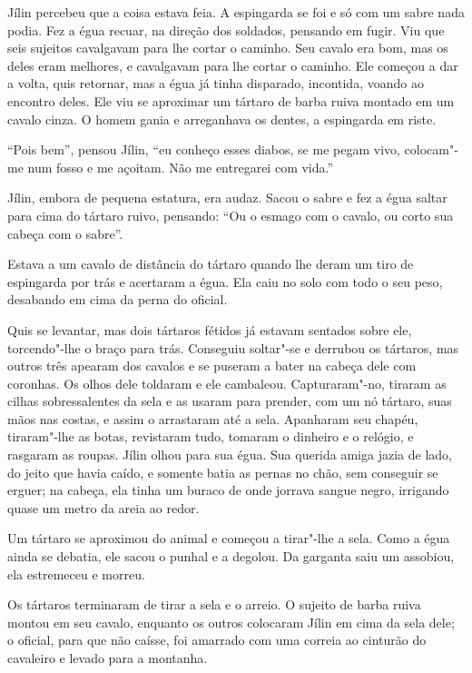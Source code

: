 Jílin percebeu que a coisa estava feia. A espingarda se foi e só com um
sabre nada podia. Fez a égua recuar, na direção dos soldados,
pensando em fugir. Viu que seis sujeitos cavalgavam para lhe cortar o
caminho. Seu cavalo era bom, mas os deles eram melhores, e cavalgavam
para lhe cortar o caminho. Ele começou a dar a volta, quis retornar, mas
a égua já tinha disparado, incontida, voando ao encontro deles. Ele viu
se aproximar um tártaro de barba ruiva montado em um cavalo cinza. O
homem gania e arreganhava os dentes, a espingarda em riste.

``Pois bem'', pensou Jílin, ``eu conheço esses diabos, se me pegam vivo,
colocam"-me num fosso e me açoitam. Não me entregarei com vida.''

Jílin, embora de pequena estatura, era audaz. Sacou o sabre e fez a égua
saltar para cima do tártaro ruivo, pensando: ``Ou o esmago com o cavalo,
ou corto sua cabeça com o sabre''.

Estava a um cavalo de distância do tártaro quando lhe deram um tiro de
espingarda por trás e acertaram a égua. Ela caiu no solo com todo o seu
peso, desabando em cima da perna do oficial.

Quis se levantar, mas dois tártaros fétidos já estavam sentados sobre
ele, torcendo"-lhe o braço para trás. Conseguiu soltar"-se e derrubou os
tártaros, mas outros três apearam dos cavalos e se puseram a bater na
cabeça dele com coronhas. Os olhos dele toldaram e ele cambaleou.
Capturaram"-no, tiraram as cilhas sobressalentes da sela e as usaram para prender, com um nó tártaro, suas mãos nas costas, e assim o arrastaram
até a sela. Apanharam seu chapéu, tiraram"-lhe as botas,
revistaram tudo, tomaram o dinheiro e o relógio, e rasgaram as roupas.
Jílin olhou para sua égua. Sua querida amiga jazia de lado, do jeito que
havia caído, e somente batia as pernas no chão, sem conseguir se erguer;
na cabeça, ela tinha um buraco de onde jorrava sangue negro, irrigando quase um metro da areia ao redor.

Um tártaro se aproximou do animal e começou a tirar"-lhe a sela. Como a
égua ainda se debatia, ele sacou o punhal e a degolou. Da garganta saiu um assobiou, ela estremeceu e morreu.

Os tártaros terminaram de tirar a sela e o arreio. O sujeito de barba
ruiva montou em seu cavalo, enquanto os outros colocaram Jílin em cima
da sela dele; o oficial, para que não caísse, foi amarrado com uma
correia ao cinturão do cavaleiro e levado para a montanha.


